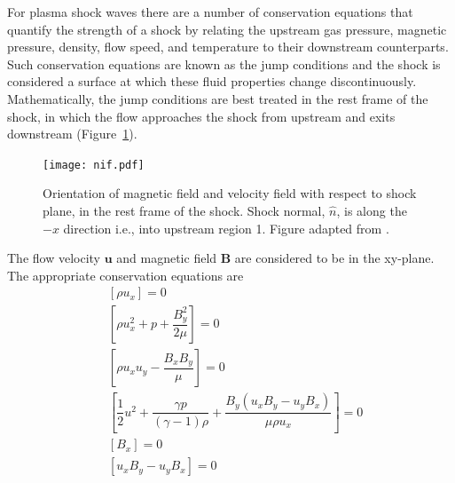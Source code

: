 For plasma shock waves there are a number of conservation equations that quantify the strength of a shock by relating the upstream gas pressure, magnetic pressure, density, flow speed, and temperature to their downstream counterparts. Such conservation equations are known as the jump conditions and the shock is considered a surface at which these fluid properties change discontinuously. Mathematically, the jump conditions are best treated in the rest frame of the shock, in which the flow approaches the shock from upstream and exits downstream (Figure~\ref{fig:shock_pic}).
\begin{figure}[h!]
\begin{center}
\texttt{[image: nif.pdf]}
\caption[MHD shock framework]{Orientation of magnetic field and velocity field with respect to shock plane, in the rest frame of the shock. Shock normal, $\hat{n}$, is along the $-x$ direction i.e., into upstream region 1. Figure adapted from \citet{ball2001}.}
\label{fig:shock_pic}
\end{center}
\end{figure}
The flow velocity $\mathbf{u}$ and magnetic field $\mathbf{B}$ are considered to be in the xy-plane. The appropriate conservation  equations are
\begin{subequations}
\begin{align}
&[\rho u_{x}]=0 \\
&[\rho u_{x}^2+p+\dfrac{B_{y}^2}{2\mu}]=0 \\
&[\rho u_{x}u_{y} - \dfrac{B_{x}B_{y}}{\mu}]=0 \\
&[\dfrac{1}{2}u^2 + \dfrac{\gamma p}{(\gamma-1) \rho}+\dfrac{ B_{y}(u_{x}B_{y} - u_{y}B_{x})}{\mu \rho u_{x}} ]=0 \\
&[B_{x}]=0 \\
&[u_{x}B_{y} - u_{y}B_{x}]=0 
\end{align}
\label{eqn:jump_conditions}
\end{subequations}

